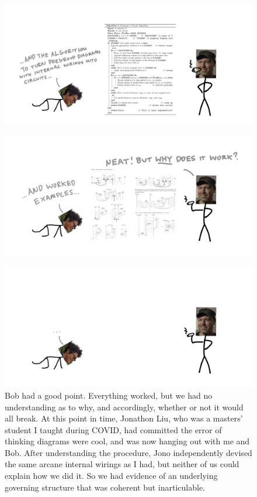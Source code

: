 \begin{figure}[h!]
\includegraphics{figures/cartoons/pregroup2}
\end{figure}

\begin{figure}[h!]
\includegraphics{figures/cartoons/pregroup3}
\end{figure}

\begin{figure}[h!]
\includegraphics{figures/cartoons/pregroup4}
\caption{Bob had a good point. Everything worked, but we had no understanding as to why, and accordingly, whether or not it would all break. At this point in time, Jonathon Liu, who was a masters' student I taught during COVID, had committed the error of thinking diagrams were cool, and was now hanging out with me and Bob. After understanding the procedure, Jono independently devised the same arcane internal wirings as I had, but neither of us could explain how we did it. So we had evidence of an underlying governing structure that was coherent but inarticulable.}
\end{figure}

